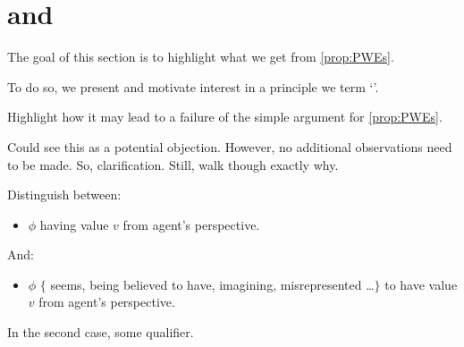 \section{ and }
\label{cha:zSpA:sec:difficulty}

\begin{note}
  The goal of this section is to highlight what we get from \autoref{prop:PWEs}.

  To do so, we present and motivate interest in a principle we term `\ptivity{}'.

  Highlight how it may lead to a failure of the simple argument for \autoref{prop:PWEs}.

  Could see this as a potential objection.
  However, no additional observations need to be made.
  So, clarification.
  Still, walk though exactly why.
\end{note}

\begin{note}
  Distinguish between:
  \begin{itemize}
  \item
    \(\phi\) having value \(v\) from agent's perspective.
  \end{itemize}
  And:
    \begin{itemize}
  \item
    \(\phi\) \(\{\) seems, being believed to have, imagining, misrepresented \dots \(\}\) to have value \(v\) from agent's perspective.
  \end{itemize}

  In the second case, some qualifier.
\end{note}

